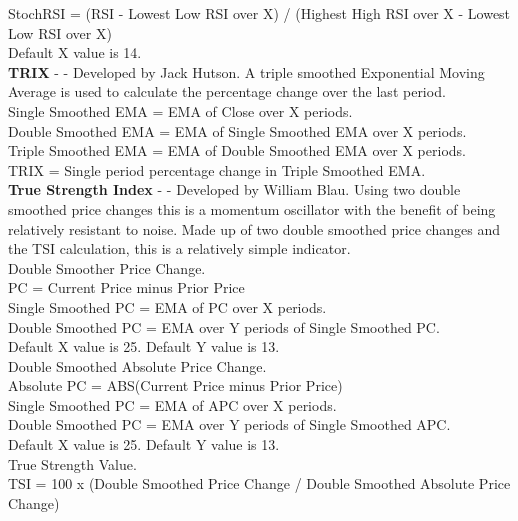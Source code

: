 \documentclass[12pt,a4paper]{article}
\begin{document}
\noindent
StochRSI = (RSI - Lowest Low RSI over X) / (Highest High RSI over X - Lowest Low RSI over X)\\
Default X value is 14.\\

\iffalse
[]
\fi

\noindent
\textbf{TRIX} - \cite{Hutson1983} - Developed by Jack Hutson. A triple smoothed Exponential Moving Average is used to calculate the percentage change over the last period.\\

\noindent
Single Smoothed EMA = EMA of Close over X periods.\\
Double Smoothed EMA = EMA of Single Smoothed EMA over X periods.\\
Triple Smoothed EMA = EMA of Double Smoothed EMA over X periods.\\
TRIX = Single period percentage change in Triple Smoothed EMA. \\

\iffalse
[]
\fi

\noindent
\textbf{True Strength Index} - \cite{Blau1995} - Developed by William Blau. Using two double smoothed price changes this is a momentum oscillator with the benefit of being relatively resistant to noise. Made up of two double smoothed price changes and the TSI calculation, this is a relatively simple indicator.\\

\noindent
Double Smoother Price Change.\\
PC = Current Price minus Prior Price\\
Single Smoothed PC = EMA of PC over X periods.\\
Double Smoothed PC = EMA over Y periods of Single Smoothed PC.\\
Default X value is 25. Default Y value is 13.\\

\noindent
Double Smoothed Absolute Price Change. \\
Absolute PC = ABS(Current Price minus Prior Price)\\
Single Smoothed PC = EMA of APC over X periods.\\
Double Smoothed PC = EMA over Y periods of Single Smoothed APC.\\
Default X value is 25. Default Y value is 13.\\

\noindent
True Strength Value.\\
TSI = 100 x (Double Smoothed Price Change / Double Smoothed Absolute Price Change)\\
\end{document}
